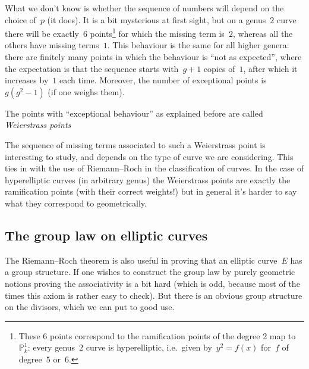 \documentclass[10pt,a4paper]{article}
\begin{document}
What we don't know is whether the sequence of numbers will depend on the choice of~$p$ (it does). It is a bit mysterious at first sight, but on a genus~$2$ curve there will be exactly~$6$ points\footnote{These 6 points correspond to the ramification points of the degree 2 map to~$\mathbb{P}_k^1$: every genus~$2$ curve is hyperelliptic, i.e.\ given by~$y^2=f(x)$ for~$f$ of degree~$5$ or~$6$.} for which the missing term is~$2$, whereas all the others have missing terms~$1$. This behaviour is the same for all higher genera: there are finitely many points in which the behaviour is ``not as expected'', where the expectation is that the sequence starts with~$g+1$ copies of~$1$, after which it increases by~$1$ each time. Moreover, the number of exceptional points is~$g(g^2-1)$ (if one weighs them).

\begin{definition}
  The points with ``exceptional behaviour'' as explained before are called \emph{Weierstrass points}
\end{definition}

The sequence of missing terms associated to such a Weierstrass point is interesting to study, and depends on the type of curve we are considering. This ties in with the use of Riemann--Roch in the classification of curves. In the case of hyperelliptic curves (in arbitrary genus) the Weierstrass points are exactly the ramification points (with their correct weights!) but in general it's harder to say what they correspond to geometrically.

\subsection{The group law on elliptic curves}
The Riemann--Roch theorem is also useful in proving that an elliptic curve~$E$ has a group structure. If one wishes to construct the group law by purely geometric notions proving the associativity is a bit hard (which is odd, because most of the times this axiom is rather easy to check). But there is an obvious group structure on the divisors, which we can put to good use.
\end{document}
